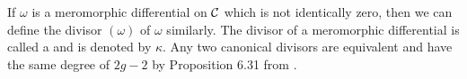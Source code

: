 \begin{definition}
    If $\omega$ is a meromorphic differential on $\mathcal C$ which is not identically zero, then we can define the divisor $(\omega)$ of $\omega$ similarly. The divisor of a meromorphic differential is called a  and is denoted by $\kappa$. Any two canonical divisors are equivalent and have the same degree of $2g-2$ by Proposition 6.31 from \cite{ref:kirwan}.
\end{definition}
